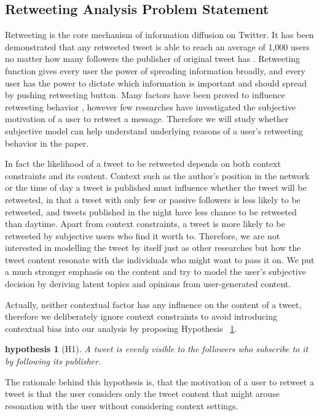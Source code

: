 \documentclass{acm_proc_article-sp}
\newtheorem{hypothesis}{hypothesis}
\begin{document}
\subsection{Retweeting Analysis Problem Statement}
\label{statement}
Retweeting is the core mechanism of information diffusion on Twitter. It has been demonstrated that any retweeted tweet is able to reach an average of 1,000 users no matter how many followers the publisher of original tweet has \cite{Kwak:2010TSN}. Retweeting function gives every user the power of spreading information broadly, and every user has the power to dictate which information is important and should spread by pushing retweeting button. Many factors have been proved to influence retweeting behavior \cite{Suh2010,conf/icwsm/MacskassyM11,Comarela:2012UFA}, however few researches have investigated the subjective motivation of a user to retweet a message. Therefore we will study whether subjective model can help understand underlying reasons of a user's retweeting behavior in the paper.

In fact the likelihood of a tweet to be retweeted depends on both context constraints and its content. 
Context such as the author's position in the network or the time of day a tweet is published must influence whether the tweet will be retweeted, in that a tweet with only few or passive followers is less likely to be retweeted, and tweets published in the night have less chance to be retweeted than daytime.
Apart from context constraints, a tweet is more likely to be retweeted by subjective users who find it worth to. Therefore, we are not interested in modelling the tweet by itself just as other researches \cite{Naveed:2011SMC,2011:NaveedGKC,conf/icwsm/PfitznerGS12} but how the tweet content resonate with the individuals who might want to pass it on. We put a much stronger emphasis on the content and try to model the user's subjective decision by deriving latent topics and opinions from user-generated content. 
 
Actually, neither contextual factor has any influence on the content of a tweet, therefore we deliberately ignore context constraints to avoid introducing contextual bias into our analysis by proposing  Hypothesis ~\ref{hypothesis1}. 
\begin{hypothesis}[H1]
\label{hypothesis1}
A tweet is evenly visible to the followers who subscribe to it by following its publisher.
\end{hypothesis}
The rationale behind this hypothesis is, that the motivation of a user to retweet a tweet is that the user considers only the tweet content that might arouse resonation with the user without considering context settings.
\end{document}
